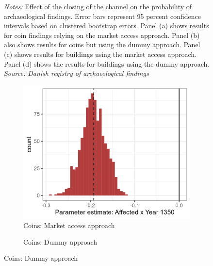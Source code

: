 \documentclass[11pt]{article}
\begin{document}
\begin{figure}[h!]
\begin{subfigure}[b]{0.45\textwidth}
    \end{subfigure}
    \parbox{0.9\textwidth}{
    \caption*{\footnotesize \textit{Notes:} Effect of the closing of the channel on the probability of archaeological findings. Error bars represent 95 percent confidence intervals based on clustered bootstrap errors. Panel (a) shows results for coin findings relying on the market access approach. Panel (b) also shows results for coins but using the dummy approach. Panel (c) shows results for buildings using the market access approach. Panel (d) shows the results for buildings using the dummy approach.  \\ \textit{Source: Danish registry of archaeological findings}}
}    \label{fig:arch_reg}
\end{figure}


\begin{figure}[h!]
    \centering
    \caption{Distribution of parameter estimates in 1350}
    \begin{subfigure}[b]{0.45\textwidth}
        \centering
        \caption{\label{fig:distri_a} Coins: Market access approach}
        \includegraphics[width=\textwidth]{Plots/Regression_plots/arch_MA_coins_boot.png}
    \end{subfigure}
    \hfill
    \begin{subfigure}[b]{0.45\textwidth}
        \centering
        \caption{\label{fig:distri_b} Coins: Dummy approach}

\end{subfigure}
\end{figure}
\end{document}
